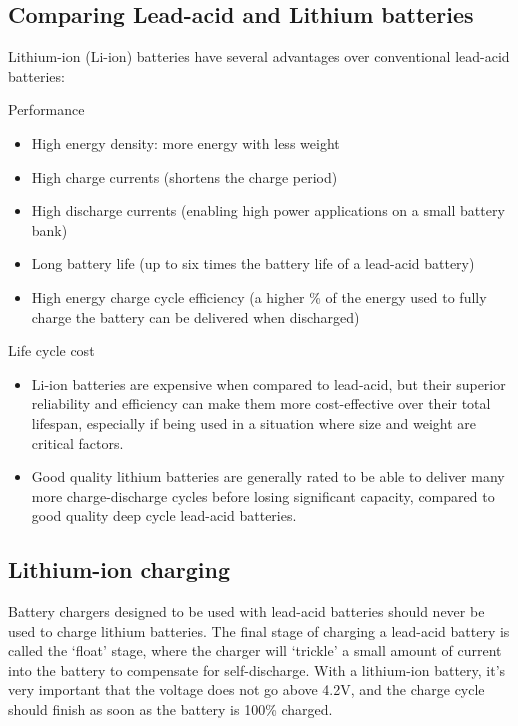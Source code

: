\documentclass{article}
\theoremstyle{definition}
\theoremstyle{definition}
\theoremstyle{remark}
\begin{document}
  \subsection{Comparing Lead-acid and Lithium batteries} %
  \label{sub:comparing_lead_acid_and_lithium_batteries}

    Lithium-ion (Li-ion) batteries have several advantages over conventional lead-acid batteries:

    Performance

      \begin{itemize}
        \item High energy density: more energy with less weight
        \item High charge currents (shortens the charge period)
        \item High discharge currents (enabling high power applications on a small battery bank)
        \item Long battery life (up to six times the battery life of a lead-acid battery)
        \item High energy charge cycle efficiency (a higher \% of the energy used to fully charge the battery can be delivered when discharged)
      \end{itemize}

    Life cycle cost

      \begin{itemize}
        \item Li-ion batteries are expensive when compared to lead-acid, but their superior reliability and efficiency can make them more cost-effective over their total lifespan, especially if being used in a situation where size and weight are critical factors. 
        \item Good quality lithium batteries are generally rated to be able to deliver many more charge-discharge cycles before losing significant capacity, compared to good quality deep cycle lead-acid batteries.
      \end{itemize}


  \subsection{Lithium-ion charging} %
  \label{sub:lithium_ion_charging}

    Battery chargers designed to be used with lead-acid batteries should never be used to charge lithium batteries. The final stage of charging a lead-acid battery is called the ‘float’ stage, where the charger will ‘trickle’ a small amount of current into the battery to compensate for self-discharge. With a lithium-ion battery, it’s very important that the voltage does not go above 4.2V, and the charge cycle should finish as soon as the battery is 100\% charged.
\end{document}
